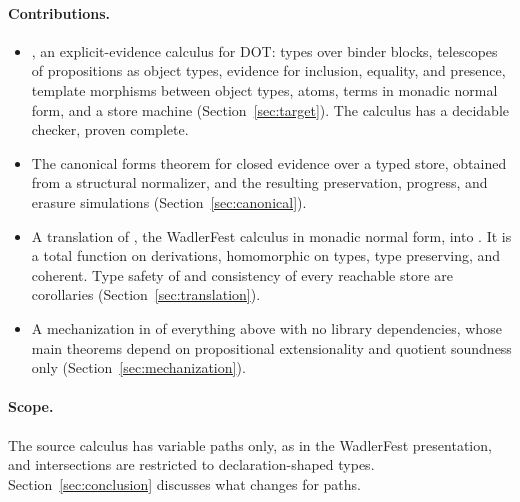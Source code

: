 \paragraph{Contributions.}
\begin{itemize}
\item \FCdot, an explicit-evidence calculus for DOT: types over binder blocks, telescopes of propositions as object types, evidence for inclusion, equality, and presence, template morphisms between object types, atoms, terms in monadic normal form, and a store machine (Section~\ref{sec:target}). The calculus has a decidable checker, proven complete.
\item The canonical forms theorem for closed evidence over a typed store, obtained from a structural normalizer, and the resulting preservation, progress, and erasure simulations (Section~\ref{sec:canonical}).
\item A translation of \DOTMNF, the WadlerFest calculus in monadic normal form, into \FCdot. It is a total function on derivations, homomorphic on types, type preserving, and coherent. Type safety of \DOTMNF and consistency of every reachable store are corollaries (Section~\ref{sec:translation}).
\item A mechanization in \Lean of everything above with no library dependencies, whose main theorems depend on propositional extensionality and quotient soundness only (Section~\ref{sec:mechanization}).
\end{itemize}

\paragraph{Scope.}
The source calculus has variable paths only, as in the WadlerFest presentation, and intersections are restricted to declaration-shaped types. Section~\ref{sec:conclusion} discusses what changes for paths.
